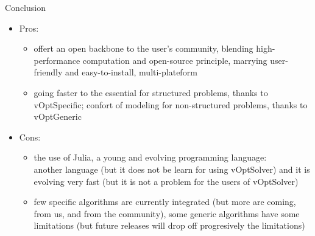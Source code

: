 \documentclass[10pt,xcolor=dvipsnames]{beamer}
\begin{document}
\begin{frame}{Conclusion}

\begin{itemize}

\item Pros:
\begin{itemize}

    \item offert an open backbone to the user's community, blending high-performance computation and open-source principle, marrying user-friendly and  easy-to-install, multi-plateform
    \smallskip

    \item  going faster to the essential for structured problems, thanks to vOptSpecific; confort of modeling for non-structured problems, thanks to vOptGeneric   
        
\end{itemize}    
\medskip

\item Cons:
\begin{itemize}
    \item the use of Julia, a young and evolving programming language:\\
     another language (but it does not be learn for using vOptSolver) and it is evolving very fast (but it is not a problem for the users of vOptSolver)
         \smallskip

    \item few specific algorithms are currently integrated (but more are coming, from us, and from the community), some generic algorithms have some limitations (but future releases will drop off progresively the limitations)
        
\end{itemize} 

\end{itemize}

\end{frame}
\end{document}

